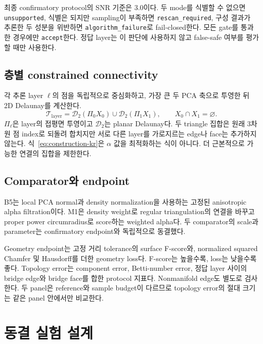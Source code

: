 \documentclass[12pt,a4paper]{article}
\begin{document}
최종 confirmatory protocol의 SNR 기준은 3.0이다. 두 mode를 식별할 수 없으면
\texttt{unsupported}, 식별은 되지만 sampling이 부족하면
\texttt{rescan\_required}, 구성 결과가 추론한 두 성분을 위반하면
\texttt{algorithm\_failure}로 fail-closed한다. 모든 gate를 통과한 경우에만
\texttt{accept}한다. 정답 layer는 이 판단에 사용하지 않고 false-safe 여부를
평가할 때만 사용한다.

\subsection{층별 constrained connectivity}

각 추론 layer $\ell$의 점을 독립적으로 중심화하고, 가장 큰 두 PCA 축으로
투영한 뒤 2D Delaunay를 계산한다.
\begin{equation}
 \mathcal{T}_{\mathrm{layer}}
 =\mathcal{D}_{2}(\Pi_0 X_0)\cup\mathcal{D}_{2}(\Pi_1 X_1),
 \qquad X_0\cap X_1=\varnothing.
 \label{eq:construction-kr}
\end{equation}
$\Pi_\ell$은 layer의 접평면 투영이고 $\mathcal{D}_2$는 planar Delaunay다.
두 triangle 집합은 원래 3차원 점 index로 되돌려 합치지만 서로 다른 layer를
가로지르는 edge나 face는 추가하지 않는다. 식~\eqref{eq:construction-kr}은
$\alpha$ 값을 최적화하는 식이 아니다. 더 근본적으로 가능한 연결의 집합을
제한한다.

\subsection{Comparator와 endpoint}

B5는 local PCA normal과 density normalization을 사용하는 고정된
anisotropic alpha filtration이다. M1은 density weight로 regular
triangulation의 연결을 바꾸고 proper power circumradius로 score하는 weighted
alpha다. 두 comparator의 scale과 parameter는 confirmatory endpoint와
독립적으로 동결했다.

Geometry endpoint는 고정 거리 tolerance의 surface F-score와, normalized
squared Chamfer 및 Hausdorff를 더한 geometry loss다. F-score는 높을수록,
loss는 낮을수록 좋다. Topology error는 component error, Betti-number error,
정답 layer 사이의 bridge edge와 bridge face를 합한 protocol 지표다.
Nonmanifold edge도 별도로 검사한다. 두 panel은 reference와 sample budget이
다르므로 topology error의 절대 크기는 같은 panel 안에서만 비교한다.

\section{동결 실험 설계}
\end{document}
